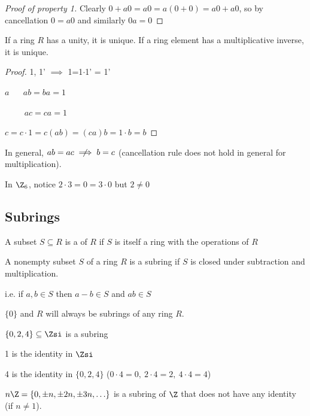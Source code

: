 \begin{proof}[Proof of property 1]
    Clearly \(0+a0 = a0 = a(0+0) = a0 + a0\), so by cancellation \(0=a0\) and similarly \(0a=0\)
\end{proof}

\begin{theorem}
  If a ring \(R\) has a unity, it is unique. If a ring element has a multiplicative inverse, it is unique.
\end{theorem}

\begin{proof}
1, 1' \(\implies\) 1=1\(\cdot\)1' = 1'

\(a\) \(\quad\) \(ab=ba = 1\)

\(\qquad\) \(ac=ca=1\)

\(c = c\cdot 1 = c(ab) = (ca)b = 1\cdot b = b\)
\end{proof}

\begin{warning}
In general, \(ab = ac \centernot\implies b=c\) (cancellation rule does not hold in general for multiplication).
\end{warning}

\begin{example}
  In \(\Z_6\), notice \(2\cdot 3 = 0 = 3\cdot 0\) but \(2\neq 0\)
\end{example}

\subsection{Subrings}

\begin{definition}[Subring]
  A subset \(S\subseteq R\) is a  of \(R\) if \(S\) is itself a ring with the operations of \(R\)
\end{definition}

\begin{theorem}
  A nonempty subset \(S\) of a ring \(R\) is a subring if \(S\)  is closed under subtraction and multiplication.

  i.e. if \(a,b\in S\) then \(a-b\in S\) and \(ab \in S\)
\end{theorem}

\begin{example}
  \(\{0\}\) and \(R\) will always be subrings of any ring \(R\).
\end{example}

\begin{example}
  \(\{0,2,4\}\subseteq \Zsi\) is a subring

  1 is the identity in \(\Zsi\)

  4 is the identity in \(\{0,2,4\}\) (\(0\cdot 4 = 0,\ 2\cdot 4 = 2,\ 4\cdot 4 = 4\))
\end{example}

\begin{example}
  \(n\Z = \{0, \pm n, \pm 2n, \pm 3n,\ldots\}\) is a subring of \(\Z\) that does not have any identity (if \(n\neq 1\)).
\end{example}